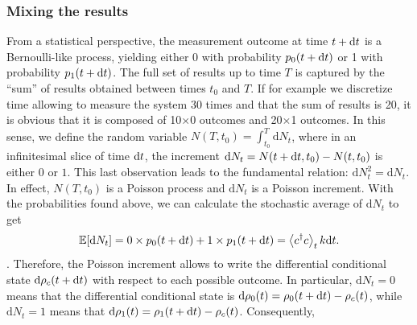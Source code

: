 \subsubsection{Mixing the results}
From a statistical perspective, the measurement outcome at time $t+\mathrm{d}t$ is a Bernoulli-like process, yielding either 0 with probability $p_0(t+\mathrm{d}t)$ or 1 with probability $p_1(t+\mathrm{d}t)$. The full set of results up to time $T$ is captured by the ``sum'' of results obtained between times $t_0$ and $T$. If for example we discretize time allowing to measure the system 30 times and that the sum of results is 20, it is obvious that it is composed of 10$\times$0 outcomes and 20$\times$1 outcomes. In this sense, we define the random variable $N(T,t_0)=\int_{t_0}^T \mathrm{d}N_t$, where in an infinitesimal slice of time $\mathrm{d}t$, the increment $\mathrm{d}N_t=N(t+\mathrm{d}t,t_0)-N(t,t_0)$ is either $0$ or $1$. This last observation leads to the fundamental relation: $\mathrm{d}N_t^2=\mathrm{d}N_t$.  In effect, $N(T,t_0)$ is a Poisson process and  $\mathrm{d}N_t$ is a Poisson increment\footnotemark. With the probabilities found above, we can calculate the stochastic average of $\mathrm{d}N_t$ to get
\begin{equation}\label{eq:avPoisson}
    \mathbb{E}\qty[\mathrm{d}N_t]=0\times p_0(t+\mathrm{d}t)+1\times p_1(t+\mathrm{d}t) = \expval{c^\dagger c}_t k\mathrm{d}t.
\end{equation}
. Therefore, the Poisson increment allows to write the differential conditional state $\mathrm{d}\rho_c(t+\mathrm{d}t)$ with respect to each possible outcome. In particular, $\mathrm{d}N_t=0$ means that the differential conditional state is $\mathrm{d}\rho_0(t)=\rho_0(t+\mathrm{d}t)-\rho_c(t)$, while $\mathrm{d}N_t=1$ means that $\mathrm{d}\rho_1(t)=\rho_1(t+\mathrm{d}t)-\rho_c(t)$. Consequently, 
